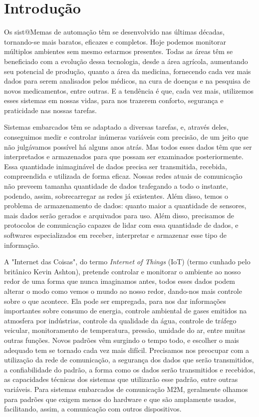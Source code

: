 \chapter{Introdução}
\label{chap:Introducao}

	Os sist@Memas de automação têm se desenvolvido nas últimas décadas, tornando-se mais baratos, eficazes e completos. Hoje podemos monitorar múltiplos ambientes sem mesmo estarmos presentes. Todas as áreas têm se beneficiado com a evolução dessa tecnologia, desde a área agrícola, aumentando seu potencial de produção, quanto a área da medicina, fornecendo cada vez mais dados para serem analisados pelos médicos, na cura de doenças e na pesquisa de novos medicamentos, entre outras. E a tendência é que, cada vez mais, utilizemos esses sistemas em nossas vidas, para nos trazerem conforto, segurança e praticidade nas nossas tarefas.
	
	Sistemas embarcados têm se adaptado a diversas tarefas, e, através deles, conseguimos medir e controlar inúmeras variáveis com precisão, de um jeito que não julgávamos possível há alguns anos atrás. Mas todos esses dados têm que ser interpretados e armazenados para que possam ser examinados posteriormente. Essa quantidade inimaginável de dados precisa ser transmitida, recebida, compreendida e utilizada de forma eficaz. Nossas redes atuais de comunicação não preveem tamanha quantidade de dados trafegando a todo o instante, podendo, assim, sobrecarregar as redes já existentes. Além disso, temos o problema de armazenamento de dados: quanto maior a quantidade de sensores, mais dados serão gerados e arquivados para uso. Além disso, precisamos de protocolos de comunicação capazes de lidar com essa quantidade de dados, e softwares especializados em receber, interpretar e armazenar esse tipo de informação.
	
	A "Internet das Coisas", do termo \textit{Internet of Things} (IoT) (termo cunhado pelo britânico Kevin Ashton), pretende controlar e monitorar o ambiente ao nosso redor de uma forma que nunca imaginamos antes, todos esses dados podem alterar o modo como vemos o mundo ao nosso redor, dando-nos mais controle sobre o que acontece. Ela pode ser empregada, para nos dar informações importantes sobre consumo de energia, controle ambiental de gases emitidos na atmosfera por indústrias, controle da qualidade da água, controle de tráfego veicular, monitoramento de temperatura, pressão, umidade do ar, entre muitas outras funções. Novos padrões vêm surgindo o tempo todo, e escolher o mais adequado tem se tornado cada vez mais difícil. Precisamos nos preocupar com a utilização da rede de comunicação, a segurança dos dados que serão transmitidos, a confiabilidade do padrão, a forma como os dados serão transmitidos e recebidos, as capacidades técnicas dos sistemas que utilizarão esse padrão, entre outras variáveis. Para sistemas embarcados de comunicação M2M, geralmente olhamos para padrões que exigem menos do hardware e que são amplamente usados, facilitando, assim, a comunicação com outros dispositivos.
	
